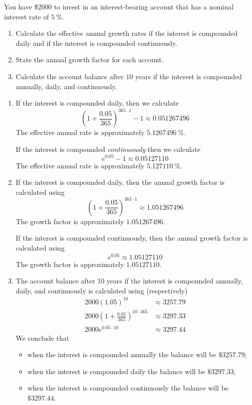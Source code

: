 \begin{pccexample}\label{exp:prob:compound5all}%
	You have \$2000 to invest in an interest-bearing account that has a nominal interest rate of $\SI{5}{\percent}$.
	\begin{enumerate}
		\item Calculate the effective annual growth rates if the interest is compounded daily and if the interest is compounded continuously.  
		\item State the annual growth factor for each account.
		\item Calculate the account balance after $10$ years if the interest is compounded annually, daily, and continuously. 
	\end{enumerate}
	\begin{pccsolution}
		\begin{enumerate}
			\item If the interest is compounded daily, then we calculate
			\[
				\left(1+\frac{0.05}{365}\right)^{365\cdot 1} -1 \approx 0.051267496
			\]
			The effective annual rate is approximately $\SI{5.1267496}{\percent}$.
																									
			If the interest is compounded \emph{continuously} then we calculate
			\[
				e^{0.05}-1\approx 0.05127110
			\]
			The effective annual rate is approximately $\SI{5.127110}{\percent}$.
			\item If the interest is compounded daily, then the annual 
			growth factor is calculated using
			\[
				\left(1+\frac{0.05}{365}\right)^{365\cdot 1} \approx 1.051267496
			\]
			The growth factor is approximately $1.051267496$.
																									
			If the interest is compounded continuously, then the annual 
			growth factor is calculated using
			\[
				e^{0.05} \approx 1.05127110
			\]
			The growth factor is approximately $1.05127110$.
			\item The account balance after 10 years if the interest is compounded annually, daily, and continuously 
			is calculated using (respectively)
			\begin{align*}
				2000(1.05)^{10}                                   & \approx 3257.79 \\
				2000\left(1+\frac{0.05}{365}\right)^{10\cdot 365} & \approx 3297.33 \\
				2000e^{0.05\cdot 10}                              & \approx 3297.44 
			\end{align*}
			We conclude that 
			\begin{itemize}
				\item when the interest is compounded annually the balance will be $\$3257.79$;
				\item when the interest is compounded daily the balance will be $\$3297.33$;
				\item when the interest is compounded continuously the balance will be $\$3297.44$.
			\end{itemize}
		\end{enumerate}
	\end{pccsolution}
\end{pccexample}
			
